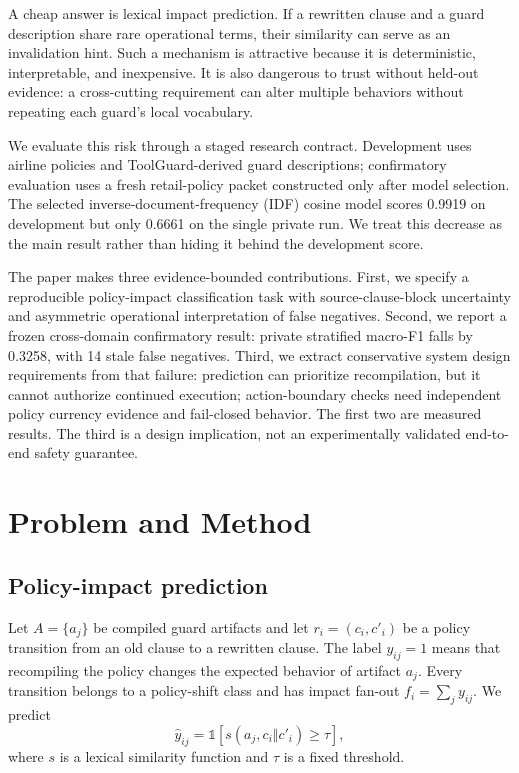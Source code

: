 \documentclass{article}
\begin{document}
A cheap answer is lexical impact prediction. If a rewritten clause and a guard description share rare operational terms, their similarity can serve as an invalidation hint. Such a mechanism is attractive because it is deterministic, interpretable, and inexpensive. It is also dangerous to trust without held-out evidence: a cross-cutting requirement can alter multiple behaviors without repeating each guard's local vocabulary.

We evaluate this risk through a staged research contract. Development uses airline policies and ToolGuard-derived guard descriptions; confirmatory evaluation uses a fresh retail-policy packet constructed only after model selection. The selected inverse-document-frequency (IDF) cosine model scores 0.9919 on development but only 0.6661 on the single private run. We treat this decrease as the main result rather than hiding it behind the development score.

The paper makes three evidence-bounded contributions. First, we specify a reproducible policy-impact classification task with source-clause-block uncertainty and asymmetric operational interpretation of false negatives. Second, we report a frozen cross-domain confirmatory result: private stratified macro-F1 falls by 0.3258, with 14 stale false negatives. Third, we extract conservative system design requirements from that failure: prediction can prioritize recompilation, but it cannot authorize continued execution; action-boundary checks need independent policy currency evidence and fail-closed behavior. The first two are measured results. The third is a design implication, not an experimentally validated end-to-end safety guarantee.

\section{Problem and Method}

\subsection{Policy-impact prediction}

Let $A=\{a_j\}$ be compiled guard artifacts and let $r_i=(c_i,c'_i)$ be a policy transition from an old clause to a rewritten clause. The label $y_{ij}=1$ means that recompiling the policy changes the expected behavior of artifact $a_j$. Every transition belongs to a policy-shift class and has impact fan-out $f_i=\sum_j y_{ij}$. We predict
\begin{equation}
\hat y_{ij}=\mathbb{1}[s(a_j,c_i\Vert c'_i)\geq\tau],
\end{equation}
where $s$ is a lexical similarity function and $\tau$ is a fixed threshold.
\end{document}
